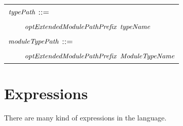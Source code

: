 \begin{center}
\begin{tabular}{rcl}
\multicolumn{3}{l}{$\textit{\rmfamily typePath}$ ::=}\\
& & $\textit{\rmfamily optExtendedModulePathPrefix}$ $\textit{\rmfamily typeName}$\\
\multicolumn{3}{l}{$\textit{\rmfamily moduleTypePath}$ ::=}\\
& & $\textit{\rmfamily optExtendedModulePathPrefix}$ $\textit{\rmfamily ModuleTypeName}$
\end{tabular}
\end{center}

\newpage
\section{Expressions}

There are many kind of expressions in the language.

